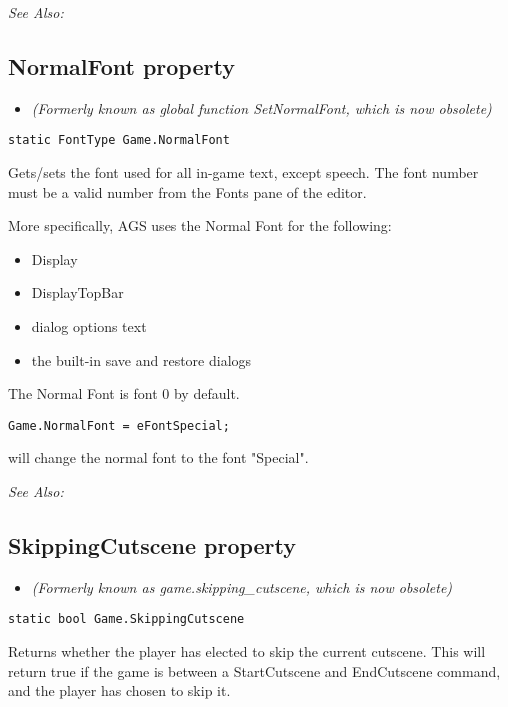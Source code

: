 \it{See Also:} 


\subsection{NormalFont property}\label{Game.NormalFont}%

\begin{itemize}
\item \it{(Formerly known as global function SetNormalFont, which is now obsolete)}
\end{itemize}

\begin{verbatim}
static FontType Game.NormalFont
\end{verbatim}
Gets/sets the font used for all in-game text, except speech.
The font number must be a valid number from the Fonts pane of the editor.

More specifically, AGS uses the Normal Font for the following:
\begin{itemize}
\item Display
\item DisplayTopBar
\item dialog options text
\item the built-in save and restore dialogs
\end{itemize}

The Normal Font is font 0 by default.

\begin{verbatim}
Game.NormalFont = eFontSpecial;
\end{verbatim}
will change the normal font to the font "Special".

\it{See Also:} 


\subsection{SkippingCutscene property}\label{Game.SkippingCutscene}%

\begin{itemize}
\item \it{(Formerly known as game.skipping_cutscene, which is now obsolete)}
\end{itemize}

\begin{verbatim}
static bool Game.SkippingCutscene
\end{verbatim}
Returns whether the player has elected to skip the current cutscene. This will return true
if the game is between a StartCutscene and EndCutscene command, and the player has chosen to
skip it.

